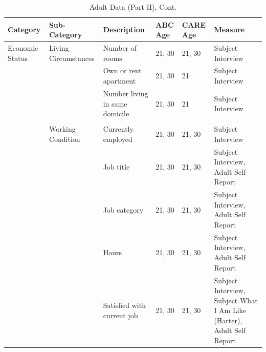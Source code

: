 \documentclass[static]{JJH-Beamer}
\begin{document}
\begin{frame}

\begin{table}[H]
\addtocounter{table}{-1}
\caption{Adult Data (Part II), Cont.}
\begin{center}
\begin{tiny}
\begin{tabular}{L{1.1cm} C{1.4cm} C{2.5cm} C{.8cm} C{.8cm} C{3cm}}
\toprule
\textbf{Category}	&	\textbf{Sub-Category}	&	\textbf{Description}	&	\textbf{ABC Age}  	&  \textbf{CARE Age}  & 	\textbf{Measure}	\\ \midrule										
Economic Status	&	Living Circumstances	&	Number of rooms	&	21, 30	&	21, 30	&	Subject Interview	\\
	&		&	Own or rent apartment	&	21, 30	&	21	&	Subject Interview	\\
	&		&	Number living in same domicile	&	21, 30	&	21	&	Subject Interview	\\
\\											
	&	Working Condition	&	Currently employed	&	21, 30	&	21, 30	&	Subject Interview	\\
	&		&	Job title	&	21, 30	&	21, 30	&	Subject Interview, Adult Self Report	\\
	&		&	Job category	&	21, 30	&	21, 30	&	Subject Interview, Adult Self Report	\\
	&		&	Hours	&	21, 30	&	21, 30	&	Subject Interview, Adult Self Report	\\
	&		&	Satisfied with current job	&	21, 30	&	21, 30	&	Subject Interview, Subject What I Am Like (Harter), Adult Self Report	\\
 \bottomrule
\end{tabular}										
\end{tiny}
\end{center}															
\end{table}

\end{frame}
\end{document}
